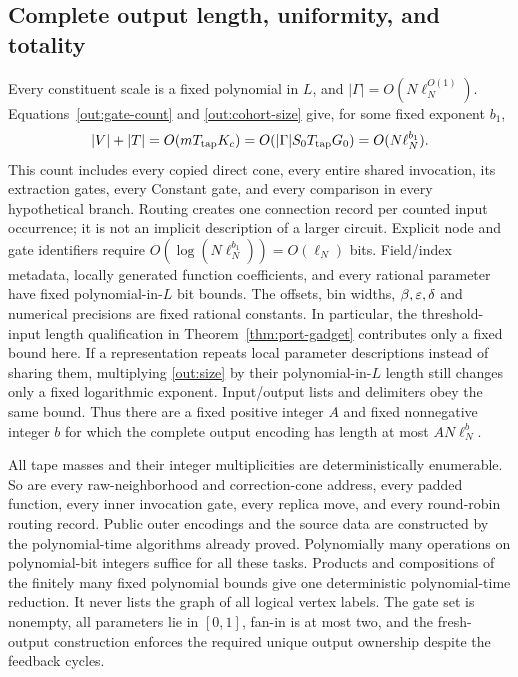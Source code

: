\subsection{Complete output length, uniformity, and totality}

Every constituent scale is a fixed polynomial in $L$, and
$|\Gamma|=O(N\ell_N^{O(1)})$. Equations~\eqref{out:gate-count} and
\eqref{out:cohort-size} give, for some fixed exponent $b_1$,
\begin{equation}\label{out:size}
 |V|+|T|=O(mT_{\rm tap}K_c)
       =O(|\Gamma|S_0T_{\rm tap}G_0)
       =O(N\ell_N^{b_1}).
\end{equation}
This count includes every copied direct cone, every entire shared
invocation, its extraction gates, every Constant gate, and every
comparison in every hypothetical branch. Routing creates one connection
record per counted input occurrence; it is not an implicit description
of a larger circuit. Explicit node and gate identifiers require
$O(\log(N\ell_N^{b_1}))=O(\ell_N)$ bits. Field/index metadata, locally
generated function coefficients, and every rational parameter have
fixed polynomial-in-$L$ bit bounds. The offsets, bin widths,
$\beta,\varepsilon,\delta$ and numerical precisions are fixed rational
constants. In particular, the threshold-input length qualification in
Theorem~\ref{thm:port-gadget} contributes only a fixed bound here.
If a representation repeats local parameter descriptions instead of
sharing them, multiplying \eqref{out:size} by their polynomial-in-$L$
length still changes only a fixed logarithmic exponent. Input/output
lists and delimiters obey the same bound. Thus there are a fixed
positive integer $A$ and fixed nonnegative integer $b$ for which the
complete output encoding has length at most $AN\ell_N^b$.

All tape masses and their integer multiplicities are deterministically
enumerable. So are every raw-neighborhood and correction-cone address,
every padded function, every inner invocation gate, every replica move,
and every round-robin routing record. Public outer encodings and the
source data are constructed by the polynomial-time algorithms already
proved. Polynomially many operations on polynomial-bit integers suffice
for all these tasks. Products and compositions of the finitely many
fixed polynomial bounds give one deterministic polynomial-time
reduction. It never lists the graph of all logical vertex labels. The
gate set is nonempty, all parameters lie in $[0,1]$, fan-in is at most
two, and the fresh-output construction enforces the required unique
output ownership despite the feedback cycles.

